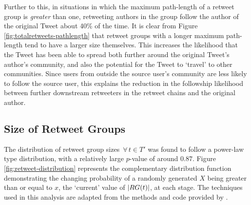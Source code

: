 
Further to this, in situations in which the maximum path-length of a retweet group is \textit{greater} than one, retweeting authors in the group follow the author of the original Tweet about 40\% of the time. It is clear from Figure \ref{fig:totalretweets-pathlength} that retweet groups with a longer maximum path-length tend to have a larger size themselves. This increases the likelihood that the Tweet has been able to spread both further around the original Tweet's author's community, and also the potential for the Tweet to `travel' to other communities. Since users from outside the source user's community are less likely to follow the source user, this explains the reduction in the followship likelihood between further downstream retweeters in the retweet chains and the original author.


\subsection{Size of Retweet Groups}
The distribution of retweet group sizes $\, \forall \, t \in T'$  was found to follow a power-law type distribution, with a relatively large $p$-value of around $0.87$. Figure \ref{fig:retweet-distribution} represents the complementary distribution function demonstrating the changing probability of a randomly generated $X$ being greater than or equal to $x$, the `current' value of $|RG(t)|$, at each stage. The techniques used in this analysis are adapted from the methods and code provided by \citet{clauset07}.


